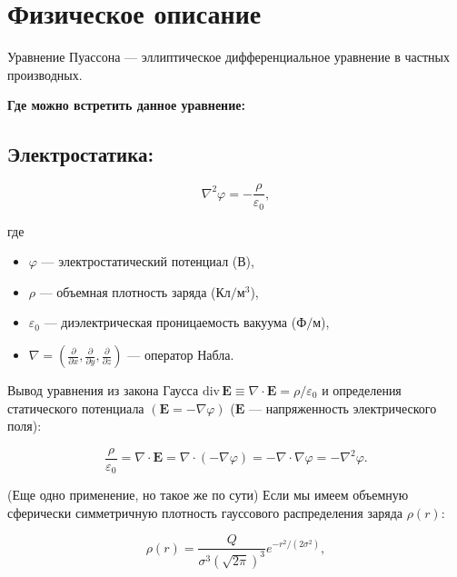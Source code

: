 \section{Физическое описание}
Уравнение Пуассона --- эллиптическое дифференциальное уравнение в частных производных.

\textbf{Где можно встретить данное уравнение:}

\subsection{ Электростатика: }

\begin{equation}
  \nabla^2 \varphi = -\frac{\rho}{\varepsilon_0},
\end{equation}

где
\begin{itemize}
  \setlength{\itemsep}{-10pt}
  \item $\varphi$ --- электростатический потенциал (В),\\
  \item $\rho$ --- объемная плотность заряда ($\text{Кл}/\text{м}^{3}$),\\
  \item $\varepsilon_0$ — диэлектрическая проницаемость вакуума ($\text{Ф}/\text{м}$),\\
  \item $\nabla = \left( \frac{\partial}{\partial x}, \frac{\partial}{\partial y}, \frac{\partial}{\partial z} \right)$ — оператор Набла.
\end{itemize}

\par Вывод уравнения из закона Гаусса $\mathrm{div}\,\mathbf{E} \equiv \nabla \cdot \mathbf{E} = \rho/ \varepsilon_0$ и определения статического потенциала $(\mathbf{E} = -\nabla \varphi)$
($\mathbf{E}$ --- напряженность электрического поля):

\begin{equation}
  \frac{\rho}{\varepsilon_0} = \nabla \cdot \mathbf{E} = \nabla \cdot (-\nabla \varphi) = - \nabla \cdot \nabla \varphi = - \nabla^2 \varphi.
\end{equation}

\par (Еще одно применение, но такое же по сути) Если мы имеем объемную сферически симметричную плотность гауссового распределения заряда $\rho(r)$:

\begin{equation}
  \rho(r) = \frac{Q}{\sigma^3(\sqrt{2\pi})^3} e^{-r^2/(2\sigma^2)},
\end{equation}

